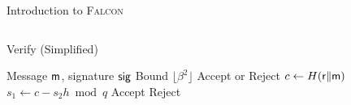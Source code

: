 \begin{frame}{Introduction to \textsc{Falcon}}
\begin{columns}[T]
\begin{block}{{\large Verify (Simplified)}}
\begin{algorithm}[H]
  \label{alg:falcon-verify}
  \begin{algorithmic}[1]
    \REQUIRE Message ${\sf m}$, signature ${\sf sig}$
    \REQUIRE Bound $\lfloor \beta^2 \rfloor$
    \ENSURE Accept or Reject
    \STATE $c \gets H({\sf r} \| {\sf m})$
    \STATE $s_1 \gets c - s_2 h \bmod q$
        \STATE Accept
    \ELSE
        \STATE Reject
    \ENDIF
  \end{algorithmic}
\end{algorithm}

\end{block}
\end{columns}
    
\end{frame}
